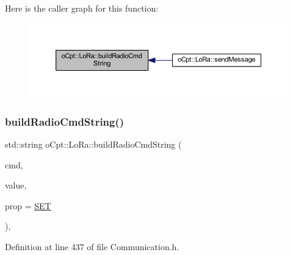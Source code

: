 Here is the caller graph for this function\+:\nopagebreak
\begin{figure}[H]
\begin{center}
\leavevmode
\includegraphics[width=350pt]{classo_cpt_1_1_lo_ra_a936158f0266e734786ed323f7b7f7a82_icgraph}
\end{center}
\end{figure}
\hypertarget{classo_cpt_1_1_lo_ra_a9fadd1ae0e020c59c5a0048f8a2878c7}{}\label{classo_cpt_1_1_lo_ra_a9fadd1ae0e020c59c5a0048f8a2878c7} 
\subsubsection{\texorpdfstring{build\+Radio\+Cmd\+String()}{buildRadioCmdString()}\hspace{0.1cm}{\footnotesize\ttfamily [2/2]}}
{\footnotesize\ttfamily std\+::string o\+Cpt\+::\+Lo\+Ra\+::build\+Radio\+Cmd\+String (\begin{DoxyParamCaption}\item[{\hyperlink{classo_cpt_1_1_lo_ra_ae987280d2d608bf474dc3f490790bc74}{Radio\+Command}}]{cmd,  }\item[{std\+::string}]{value,  }\item[{\hyperlink{classo_cpt_1_1_lo_ra_ab2678032cac766b630fb06002f0db91a}{Get\+Set}}]{prop = {\ttfamily \hyperlink{classo_cpt_1_1_lo_ra_ab2678032cac766b630fb06002f0db91aa6f1ce6bf9072aeeb8a1296caa25ea324}{S\+ET}} }\end{DoxyParamCaption})\hspace{0.3cm}{\ttfamily [inline]}, {\ttfamily [protected]}}



Definition at line 437 of file Communication.\+h.

\hypertarget{classo_cpt_1_1_lo_ra_a36aa990d9ce4981d60ef637cc26d0926}{}\label{classo_cpt_1_1_lo_ra_a36aa990d9ce4981d60ef637cc26d0926} 
